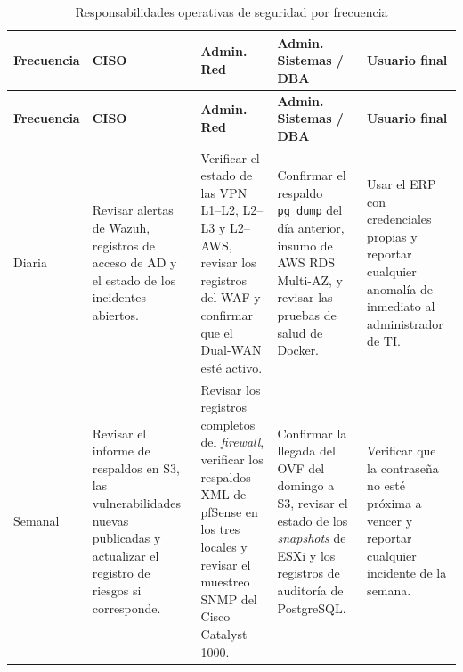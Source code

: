 \documentclass[11pt, a4paper, oneside]{report}
\begin{document}
\begin{landscape}
\thispagestyle{fancy}

\renewcommand{\arraystretch}{1.3}
\footnotesize
{}

\begin{xltabular}{\linewidth}{@{}|L{1.8cm}|X|X|X|X|@{}}
\caption{Responsabilidades operativas de seguridad por frecuencia}
\label{tab:responsabilidades_operativas_frecuencia} \\

\parbox[c][1.1cm][c]{\linewidth}{\centering\color{white}\bfseries\small Frecuencia} &
\parbox[c][1.1cm][c]{\linewidth}{\centering\color{white}\bfseries\small CISO} &
\parbox[c][1.1cm][c]{\linewidth}{\centering\color{white}\bfseries\small Admin. Red} &
\parbox[c][1.1cm][c]{\linewidth}{\centering\color{white}\bfseries\small Admin. Sistemas / DBA} &
\parbox[c][1.1cm][c]{\linewidth}{\centering\color{white}\bfseries\small Usuario final} \\ \hline
\endfirsthead

\parbox[c][1.1cm][c]{\linewidth}{\centering\color{white}\bfseries\small Frecuencia} &
\parbox[c][1.1cm][c]{\linewidth}{\centering\color{white}\bfseries\small CISO} &
\parbox[c][1.1cm][c]{\linewidth}{\centering\color{white}\bfseries\small Admin. Red} &
\parbox[c][1.1cm][c]{\linewidth}{\centering\color{white}\bfseries\small Admin. Sistemas / DBA} &
\parbox[c][1.1cm][c]{\linewidth}{\centering\color{white}\bfseries\small Usuario final} \\ \hline
\endhead

\hline
\endfoot

{\small Diaria} & {\small Revisar alertas de Wazuh, registros de acceso de AD y el estado de los incidentes abiertos.} & {\small Verificar el estado de las VPN L1--L2, L2--L3 y L2--AWS, revisar los registros del WAF y confirmar que el Dual-WAN esté activo.} & {\small Confirmar el respaldo \texttt{pg\_dump} del día anterior, insumo de AWS RDS Multi-AZ, y revisar las pruebas de salud de Docker.} & {\small Usar el ERP con credenciales propias y reportar cualquier anomalía de inmediato al administrador de TI.} \\ \hline

{\small Semanal} & {\small Revisar el informe de respaldos en S3, las vulnerabilidades nuevas publicadas y actualizar el registro de riesgos si corresponde.} & {\small Revisar los registros completos del \textit{firewall}, verificar los respaldos XML de pfSense en los tres locales y revisar el muestreo SNMP del Cisco Catalyst 1000.} & {\small Confirmar la llegada del OVF del domingo a S3, revisar el estado de los \textit{snapshots} de ESXi y los registros de auditoría de PostgreSQL.} & {\small Verificar que la contraseña no esté próxima a vencer y reportar cualquier incidente de la semana.} \\ \hline


\end{xltabular}
\end{landscape}
\end{document}
